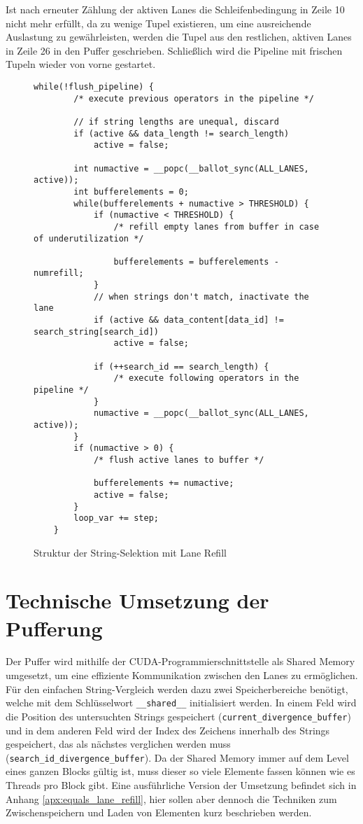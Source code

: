 Ist nach erneuter Zählung der aktiven Lanes die Schleifenbedingung in Zeile 10 nicht mehr erfüllt, da zu wenige Tupel existieren, um eine ausreichende Auslastung zu gewährleisten, werden die Tupel aus den restlichen, aktiven Lanes in Zeile 26 in den Puffer geschrieben.
Schließlich wird die Pipeline mit frischen Tupeln wieder von vorne gestartet.

\newpage

\begin{figure}[ht]
	\begin{lstlisting}[language=MyC++]
	while(!flush_pipeline) {
		/* execute previous operators in the pipeline */
		
		// if string lengths are unequal, discard
		if (active && data_length != search_length)
			active = false;
		
		int numactive = __popc(__ballot_sync(ALL_LANES, active));
		int bufferelements = 0;
		while(bufferelements + numactive > THRESHOLD) {
			if (numactive < THRESHOLD) {
				/* refill empty lanes from buffer in case of underutilization */
				
				bufferelements = bufferelements - numrefill;
			}
			// when strings don't match, inactivate the lane
			if (active && data_content[data_id] != search_string[search_id])
				active = false;
			
			if (++search_id == search_length) {
				/* execute following operators in the pipeline */
			}
			numactive = __popc(__ballot_sync(ALL_LANES, active));
		}
		if (numactive > 0) {
			/* flush active lanes to buffer */
			
			bufferelements += numactive;
			active = false;
		}
		loop_var += step;
	}
	\end{lstlisting}
	\caption{Struktur der String-Selektion mit Lane Refill}
	\label{equals_lane_refill_code}
\end{figure}

\section{Technische Umsetzung der Pufferung}
\label{sec:equals_lane_refill_pufferung}

Der Puffer wird mithilfe der CUDA-Programmierschnittstelle als Shared Memory umgesetzt, um eine effiziente Kommunikation zwischen den Lanes zu ermöglichen.
Für den einfachen String-Vergleich werden dazu zwei Speicherbereiche benötigt, welche mit dem Schlüsselwort \texttt{\_\_shared\_\_} initialisiert werden.
In einem Feld wird die Position des untersuchten Strings gespeichert (\texttt{current\_divergence\_buffer}) und in dem anderen Feld wird der Index des Zeichens innerhalb des Strings gespeichert, das als nächstes verglichen werden muss (\texttt{search\_id\_divergence\_buffer}).
Da der Shared Memory immer auf dem Level eines ganzen Blocks gültig ist, muss dieser so viele Elemente fassen können wie es Threads pro Block gibt.
Eine ausführliche Version der Umsetzung befindet sich in Anhang \ref{apx:equals_lane_refill}, hier sollen aber dennoch die Techniken zum Zwischenspeichern und Laden von Elementen kurz beschrieben werden.

